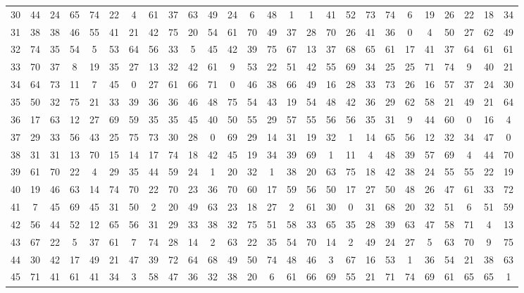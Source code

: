\begin{table}
\begin{tabular}{c c c c c c c c c c c c c c c c c c c c c c c c c c }
30 & 44 & 24 & 65 & 74 & 22 & 4 & 61 & 37 & 63 & 49 & 24 & 6 & 48 & 1 & 1 & 41 & 52 & 73 & 74 & 6 & 19 & 26 & 22 & 18 & 34 \\
31 & 38 & 38 & 46 & 55 & 41 & 21 & 42 & 75 & 20 & 54 & 61 & 70 & 49 & 37 & 28 & 70 & 26 & 41 & 36 & 0 & 4 & 50 & 27 & 62 & 49 \\
32 & 74 & 35 & 54 & 5 & 53 & 64 & 56 & 33 & 5 & 45 & 42 & 39 & 75 & 67 & 13 & 37 & 68 & 65 & 61 & 17 & 41 & 37 & 64 & 61 & 61 \\
33 & 70 & 37 & 8 & 19 & 35 & 27 & 13 & 32 & 42 & 61 & 9 & 53 & 22 & 51 & 42 & 55 & 69 & 34 & 25 & 25 & 71 & 74 & 9 & 40 & 21 \\
34 & 64 & 73 & 11 & 7 & 45 & 0 & 27 & 61 & 66 & 71 & 0 & 46 & 38 & 66 & 49 & 16 & 28 & 33 & 73 & 26 & 16 & 57 & 37 & 24 & 30 \\
35 & 50 & 32 & 75 & 21 & 33 & 39 & 36 & 36 & 46 & 48 & 75 & 54 & 43 & 19 & 54 & 48 & 42 & 36 & 29 & 62 & 58 & 21 & 49 & 21 & 64 \\
36 & 17 & 63 & 12 & 27 & 69 & 59 & 35 & 35 & 45 & 40 & 50 & 55 & 29 & 57 & 55 & 56 & 56 & 35 & 31 & 9 & 44 & 60 & 0 & 16 & 4 \\
37 & 29 & 33 & 56 & 43 & 25 & 75 & 73 & 30 & 28 & 0 & 69 & 29 & 14 & 31 & 19 & 32 & 1 & 14 & 65 & 56 & 12 & 32 & 34 & 47 & 0 \\
38 & 31 & 31 & 13 & 70 & 15 & 14 & 17 & 74 & 18 & 42 & 45 & 19 & 34 & 39 & 69 & 1 & 11 & 4 & 48 & 39 & 57 & 69 & 4 & 44 & 70 \\
39 & 61 & 70 & 22 & 4 & 29 & 35 & 44 & 59 & 24 & 1 & 20 & 32 & 1 & 38 & 20 & 63 & 75 & 18 & 42 & 38 & 24 & 55 & 55 & 22 & 19 \\
40 & 19 & 46 & 63 & 14 & 74 & 70 & 22 & 70 & 23 & 36 & 70 & 60 & 17 & 59 & 56 & 50 & 17 & 27 & 50 & 48 & 26 & 47 & 61 & 33 & 72 \\
41 & 7 & 45 & 69 & 45 & 31 & 50 & 2 & 20 & 49 & 63 & 23 & 18 & 27 & 2 & 61 & 30 & 0 & 31 & 68 & 20 & 32 & 51 & 6 & 51 & 59 \\
42 & 56 & 44 & 52 & 12 & 65 & 56 & 31 & 29 & 33 & 38 & 32 & 75 & 51 & 58 & 33 & 65 & 35 & 28 & 39 & 63 & 47 & 58 & 71 & 4 & 13 \\
43 & 67 & 22 & 5 & 37 & 61 & 7 & 74 & 28 & 14 & 2 & 63 & 22 & 35 & 54 & 70 & 14 & 2 & 49 & 24 & 27 & 5 & 63 & 70 & 9 & 75 \\
44 & 30 & 42 & 17 & 49 & 21 & 47 & 39 & 72 & 64 & 68 & 49 & 50 & 74 & 48 & 46 & 3 & 67 & 16 & 53 & 1 & 36 & 54 & 21 & 38 & 63 \\
45 & 71 & 41 & 61 & 41 & 34 & 3 & 58 & 47 & 36 & 32 & 38 & 20 & 6 & 61 & 66 & 69 & 55 & 21 & 71 & 74 & 69 & 61 & 65 & 65 & 1 \\

\end{tabular}
\end{table}
